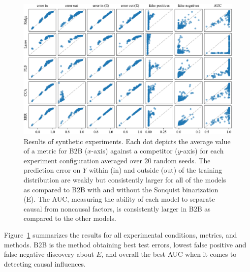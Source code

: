 \begin{figure}[htpb]
    \centering
    \includegraphics[width=\textwidth]{synthetic.pdf}
    \caption{Results of synthetic experiments. Each dot depicts the average value of a metric for B2B ($x$-axis) against a competitor ($y$-axis) for each experiment configuration averaged over $20$ random seeds. The prediction error on $Y$ within (in) and outside (out) of the training distribution are weakly but consistently larger for all of the models as compared to B2B with and without the Sonquist binarization (E). The AUC, measuring the ability of each model to separate causal from noncausal factors, is consistently larger in B2B as compared to the other models.}
    \label{table:synthetic}
\end{figure}
\fi

Figure~\ref{table:synthetic} summarizes the results for all experimental conditions, metrics, and methods.
%
B2B is the method obtaining best test errors, lowest false positive and false negative discovery about $E$, and overall the best AUC when it comes to detecting causal influences.
